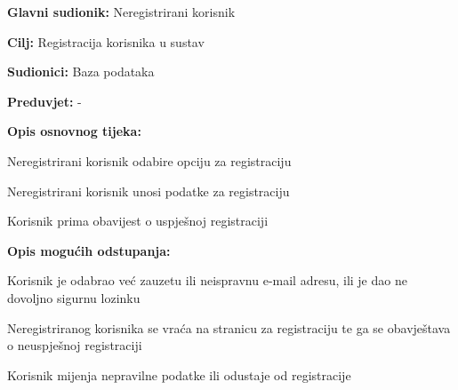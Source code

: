	
					\noindent {}
					\begin{packed_item}
	
						\item \textbf{Glavni sudionik:} Neregistrirani korisnik
						\item  \textbf{Cilj:} Registracija korisnika u sustav
						\item  \textbf{Sudionici:} Baza podataka
						\item  \textbf{Preduvjet:} -
						\item  \textbf{Opis osnovnog tijeka:}
						\item[] \begin{packed_enum}
	
							\item Neregistrirani korisnik odabire opciju za registraciju
							\item Neregistrirani korisnik unosi podatke za registraciju
							\item Korisnik prima obavijest o uspješnoj registraciji
							
						\end{packed_enum}
						
						\item  \textbf{Opis mogućih odstupanja:}
						\item[] \begin{packed_item}
	
							\item[2.a] Korisnik je odabrao već zauzetu ili neispravnu e-mail adresu, ili je dao ne dovoljno sigurnu lozinku
							\item[] \begin{packed_enum}
								
								\item Neregistriranog korisnika se vraća na stranicu za registraciju te ga se obavještava o neuspješnoj registraciji
								\item Korisnik mijenja nepravilne podatke ili odustaje od registracije	
							\end{packed_enum}
						\end{packed_item}
					\end{packed_item}
					
